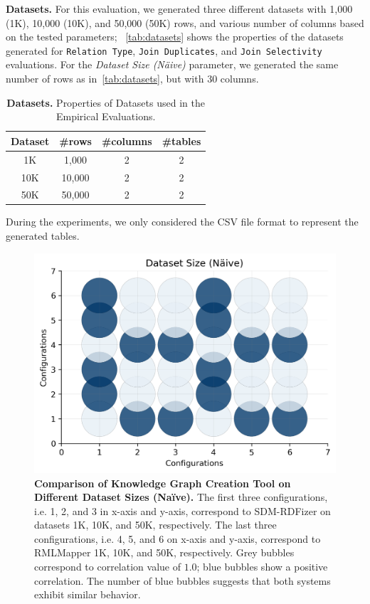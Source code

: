 \noindent \textbf{Datasets.}
For this evaluation, we generated three different datasets with 1,000 (1K), 10,000 (10K), and 50,000 (50K) rows, and various number of columns based on the tested parameters; ~\autoref{tab:datasets} shows the properties of the datasets generated for \texttt{Relation Type}, \texttt{Join Duplicates}, and \texttt{Join Selectivity} evaluations. 
For the \textit{Dataset Size (N{\"a}ive)} parameter, we generated the same number of rows as in~\autoref{tab:datasets}, but with $30$ columns.
\begin{table}[!tb]
    \centering
    \caption[Evaluated datasets]{\textbf{Datasets.} Properties of Datasets used in the Empirical Evaluations.}
    \label{tab:datasets}
    \begin{tabular}{|c|c|c|c|}
    \hline
     Dataset & \#rows & \#columns & \#tables \\ \hline
     1K & 1,000 & 2 & 2 \\ \hline 
     10K & 10,000 & 2 & 2 \\ \hline 
     50K & 50,000 & 2 & 2 \\ \hline 
     \end{tabular}
\end{table}
%
During the experiments, we only considered the CSV file format to represent the generated tables.

\begin{figure}[!tb]
    \centering
    \includegraphics[width=0.8\columnwidth]{figures/naive_allk_bubble.png}
    \caption[Knowledge Graph Creation Tool on Different Dataset Sizes (Na{\"i}ve)]{\textbf{Comparison of Knowledge Graph Creation Tool on Different Dataset Sizes (Na{\"i}ve).} The first three configurations, i.e. 1, 2, and 3 in x-axis and y-axis, correspond to SDM-RDFizer on datasets 1K, 10K, and 50K, respectively. The last three configurations, i.e. 4, 5, and 6 on x-axis and y-axis, correspond to RMLMapper 1K, 10K, and 50K, respectively. Grey bubbles correspond to correlation value of $1.0$; blue bubbles show a positive correlation. The number of blue bubbles suggests that both systems exhibit similar behavior.}
    \label{fig:naive_bubble}
\end{figure}

